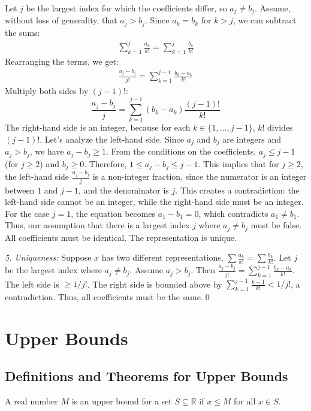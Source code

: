 Let $j$ be the largest index for which the coefficients differ, so $a_j \neq b_j$. Assume, without loss of generality, that $a_j > b_j$.
Since $a_k = b_k$ for $k > j$, we can subtract the sums:
\begin{align*}
\sum_{k=1}^j \frac{a_k}{k!} = \sum_{k=1}^j \frac{b_k}{k!}
\end{align*}
Rearranging the terms, we get:
\begin{align*}
\frac{a_j - b_j}{j!} = \sum_{k=1}^{j-1} \frac{b_k - a_k}{k!}
\end{align*}
Multiply both sides by $(j-1)!$:
\[ \frac{a_j - b_j}{j} = \sum_{k=1}^{j-1} (b_k - a_k) \frac{(j-1)!}{k!} \]
The right-hand side is an integer, because for each $k \in \{1, \dots, j-1\}$, $k!$ divides $(j-1)!$.
Let's analyze the left-hand side. Since $a_j$ and $b_j$ are integers and $a_j > b_j$, we have $a_j - b_j \geq 1$.
From the conditions on the coefficients, $a_j \leq j-1$ (for $j \ge 2$) and $b_j \geq 0$.
Therefore, $1 \leq a_j - b_j \leq j-1$.
This implies that for $j \ge 2$, the left-hand side $\frac{a_j - b_j}{j}$ is a non-integer fraction, since the numerator is an integer between $1$ and $j-1$, and the denominator is $j$.
This creates a contradiction: the left-hand side cannot be an integer, while the right-hand side must be an integer.
For the case $j=1$, the equation becomes $a_1 - b_1 = 0$, which contradicts $a_1 \neq b_1$.
Thus, our assumption that there is a largest index $j$ where $a_j \neq b_j$ must be false. All coefficients must be identical. The representation is unique.

\textit{5. Uniqueness:} Suppose $x$ has two different representations, $\sum \frac{a_k}{k!} = \sum \frac{b_k}{k!}$. Let $j$ be the largest index where $a_j \neq b_j$. Assume $a_j > b_j$. Then $\frac{a_j - b_j}{j!} = \sum_{k=1}^{j-1} \frac{b_k - a_k}{k!}$. The left side is $\ge 1/j!$. The right side is bounded above by $\sum_{k=1}^{j-1} \frac{k-1}{k!} < 1/j!$, a contradiction. Thus, all coefficients must be the same.\qed
\section{Upper Bounds}

\subsection*{Definitions and Theorems for Upper Bounds}

\begin{definition}
A real number $M$ is an upper bound for a set $S \subseteq \mathbb{R}$ if $x \leq M$ for all $x \in S$.
\end{definition}

